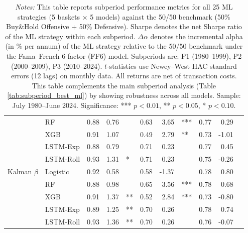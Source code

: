 \begin{table}[htbp]
{\begin{tabular}{l l c r l c r l c r l}
 & RF & 0.88 & 0.76 &     & 0.63 & 3.65 & *** & 0.77 & 0.29 &     \\
 & XGB & 0.91 & 1.07 &     & 0.49 & 2.79 & ** & 0.73 & -1.01 &     \\
 & LSTM-Exp & 0.88 & 0.79 &     & 0.71 & 0.23 &     & 0.77 & 0.45 &     \\
 & LSTM-Roll & 0.93 & 1.31 & * & 0.71 & 0.23 &     & 0.75 & -0.26 &     \\
\midrule
Kalman $\beta$ & Logistic & 0.92 & 0.58 &     & 0.58 & -1.37 &     & 0.78 & 0.80 &     \\
 & RF & 0.88 & 0.98 &     & 0.65 & 3.56 & *** & 0.78 & 0.68 &     \\
 & XGB & 0.91 & 1.37 & ** & 0.52 & 2.84 & *** & 0.73 & -0.80 &     \\
 & LSTM-Exp & 0.89 & 1.25 & ** & 0.70 & 0.26 &     & 0.78 & 0.74 &     \\
 & LSTM-Roll & 0.93 & 1.36 & ** & 0.70 & 0.26 &     & 0.76 & -0.07 &     \\
\bottomrule
\end{tabular}%
}
\caption*{\footnotesize \textit{Notes:} This table reports subperiod performance metrics for all 25 ML strategies (5 baskets $\times$ 5 models) against the 50/50 benchmark (50\% Buy\&Hold Offensive + 50\% Defensive). Sharpe denotes the net Sharpe ratio of the ML strategy within each subperiod. $\Delta\alpha$ denotes the incremental alpha (in \% per annum) of the ML strategy relative to the 50/50 benchmark under the Fama--French 6-factor (FF6) model. Subperiods are: P1 (1980--1999), P2 (2000--2009), P3 (2010--2024). $t$-statistics use Newey--West HAC standard errors (12 lags) on monthly data. All returns are net of transaction costs. This table complements the main subperiod analysis (Table \ref{tab:subperiod_best_ml}) by showing robustness across all models. Sample: July 1980--June 2024. Significance: *** $p<0.01$, ** $p<0.05$, * $p<0.10$.}
\end{table}
